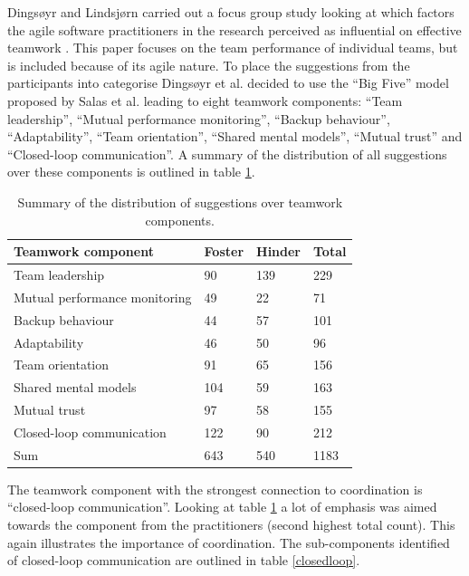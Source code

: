 Dingsøyr and Lindsjørn carried out a focus group study looking at which factors the agile software practitioners in the research perceived as influential on effective teamwork \cite{Dingsoyr2013c}. This paper focuses on the team performance of individual teams, but is included because of its agile nature. To place the suggestions from the participants into categorise Dingsøyr et al. decided to use the ``Big Five'' model proposed by Salas et al. \cite{Salas2005} leading to eight teamwork components: ``Team leadership'', ``Mutual performance monitoring'', ``Backup behaviour'', ``Adaptability'', ``Team orientation'', ``Shared mental models'', ``Mutual trust'' and ``Closed-loop communication''. A summary of the distribution of all suggestions over these components is outlined in table \ref{summary2}.

\begin{table}[H]
\begin{center}
    \begin{tabular}{ | p{4.75cm} | p{2cm} | p{2cm} | p{2cm} |}
    \hline
    \textbf{Teamwork component} & \textbf{Foster} & \textbf{Hinder} & \textbf{Total} \\ \hline
    Team leadership & 90 & 139 & 229 \\ \hline
    Mutual performance monitoring & 49 & 22 & 71 \\ \hline
    Backup behaviour & 44 & 57 & 101 \\ \hline
    Adaptability & 46 & 50 & 96 \\ \hline
    Team orientation & 91 & 65 & 156 \\ \hline
    Shared mental models & 104 & 59 & 163 \\ \hline
    Mutual trust & 97 & 58 & 155 \\ \hline
    Closed-loop communication & 122 & 90 & 212 \\ \hline
    Sum & 643 & 540 & 1183 \\ \hline
    \end{tabular}
    \caption{Summary of the distribution of suggestions over teamwork components.}
    \label{summary2}
\end{center}
\end{table}

The teamwork component with the strongest connection to coordination is ``closed-loop communication''. Looking at table \ref{summary2} a lot of emphasis was aimed towards the component from the practitioners (second highest total count). This again illustrates the importance of coordination. The sub-components identified of closed-loop communication are outlined in table \ref{closedloop}.

